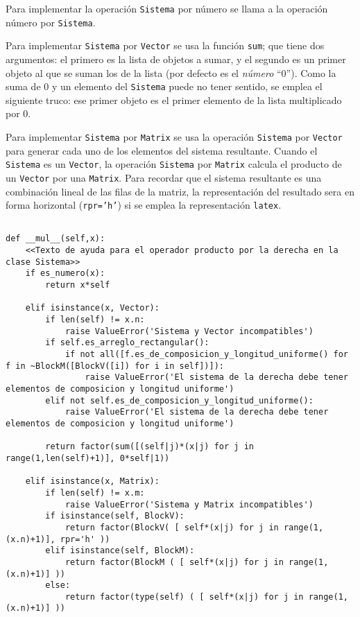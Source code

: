 \documentclass[11pt]{report}
\begin{document}
Para implementar la operación \texttt{Sistema} por número se llama a la
operación número por \texttt{Sistema}.

Para implementar \texttt{Sistema} por \texttt{Vector} se usa la función \texttt{sum}; que
tiene dos argumentos: el primero es la lista de objetos a sumar, y el
segundo es un primer objeto al que se suman los de la lista (por
defecto es el \emph{número} ``\(0\)''). Como la suma de \(0\) y un
elemento del \texttt{Sistema} puede no tener sentido, se emplea el siguiente
truco: ese primer objeto es el primer elemento de la lista
multiplicado por \(0\).

Para implementar \texttt{Sistema} por \texttt{Matrix} se usa la operación \texttt{Sistema}
por \texttt{Vector} para generar cada uno de los elementos del sistema
resultante. Cuando el \texttt{Sistema} es un \texttt{Vector}, la operación \texttt{Sistema}
por \texttt{Matrix} calcula el producto de un \texttt{Vector} por una \texttt{Matrix}. Para
recordar que el sistema resultante es una combinación lineal de las
filas de la matriz, la representación del resultado sera en forma
horizontal (\texttt{rpr='h'}) si se emplea la representación \texttt{latex}.

\begin{verbatim}

def __mul__(self,x):
    <<Texto de ayuda para el operador producto por la derecha en la clase Sistema>>
    if es_numero(x):
        return x*self

    elif isinstance(x, Vector):
        if len(self) != x.n:
            raise ValueError('Sistema y Vector incompatibles')
        if self.es_arreglo_rectangular():
            if not all([f.es_de_composicion_y_longitud_uniforme() for f in ~BlockM([BlockV([i]) for i in self])]):
                raise ValueError('El sistema de la derecha debe tener elementos de composicion y longitud uniforme')
        elif not self.es_de_composicion_y_longitud_uniforme():
            raise ValueError('El sistema de la derecha debe tener elementos de composicion y longitud uniforme')
            
        return factor(sum([(self|j)*(x|j) for j in range(1,len(self)+1)], 0*self|1))
    
    elif isinstance(x, Matrix):
        if len(self) != x.m:
            raise ValueError('Sistema y Matrix incompatibles')
        if isinstance(self, BlockV):
            return factor(BlockV( [ self*(x|j) for j in range(1,(x.n)+1)], rpr='h' ))
        elif isinstance(self, BlockM):
            return factor(BlockM ( [ self*(x|j) for j in range(1,(x.n)+1)] ))
        else:
            return factor(type(self) ( [ self*(x|j) for j in range(1,(x.n)+1)] ))

\end{verbatim}
\end{document}
